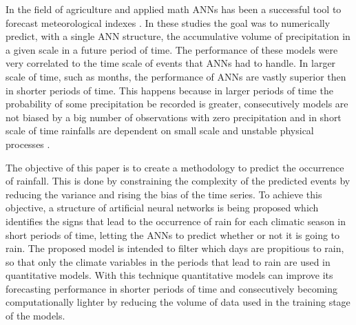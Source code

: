 In the field of agriculture and applied math ANNs has been a successful tool to forecast meteorological indexes  \cite{kumarasiri2006rainfall, nasseri2008optimized, ramirez2006linear, luk2000study, french1992rainfall, toth2000comparison, partal2015daily}. In these studies the goal was to numerically predict, with a single ANN structure, the accumulative volume of precipitation in a given scale in a future period of time. The performance of these models were very correlated to the time scale of events that ANNs had to handle. In larger scale of time, such as months, the performance of ANNs are vastly superior then in shorter periods of time. This happens because in larger periods of time the probability of some precipitation be recorded is greater, consecutively models are not biased by a big number of observations with zero precipitation \cite{schoof2001downscaling} and in short scale of time rainfalls are dependent on small scale and unstable physical processes \cite{kuligowski1998localized}.

The objective of this paper is to create a methodology to predict the occurrence of rainfall. This is done by constraining the complexity of the predicted events by reducing the variance and rising the bias of the time series. To achieve this objective, a structure of artificial neural networks is being proposed which identifies the signs that lead to the occurrence of rain for each climatic season in short periods of time, letting the ANNs to predict whether or not it is going to rain. The proposed model is intended to filter which days are propitious to rain, so that only the climate variables in the periods that lead to rain are used in quantitative models. With this technique quantitative models can improve its forecasting performance in shorter periods of time and consecutively becoming computationally lighter by reducing the volume of data used in the training stage of the models. 



